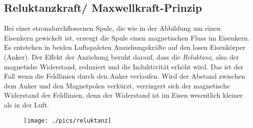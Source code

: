 		\subsection{Reluktanzkraft/ Maxwellkraft-Prinzip} \label{reluktanzkraft}
		Bei einer stromdurchflossenen Spule, die wie in der Abbildung um einen Eisenkern gewickelt ist, erzeugt die Spule einen magnetischen Fluss im Eisenkern. Es entstehen in beiden Luftspaleten Anziehungskräfte auf den losen Eisenkörper (Anker). Der Effekt der Anziehung beruht darauf, dass die \textit{Reluktanz}, also der magnetishe Widerstand, reduziert und die Induktivität erhöht wird. Das ist der Fall wenn die Feldlinien durch den Anker verlaufen. Wird der Abstand zwischen dem Anker und den Magnetpolen verkürzt, verringert sich der magnetische Widerstand der Feldlinien, denn der Widerstand ist im Eisen wesentlich kleiner als in der Luft.
		\begin{figure}[h]
			\centering
			\texttt{[image: ./pics/reluktanz]}
		\end{figure}
		
		
